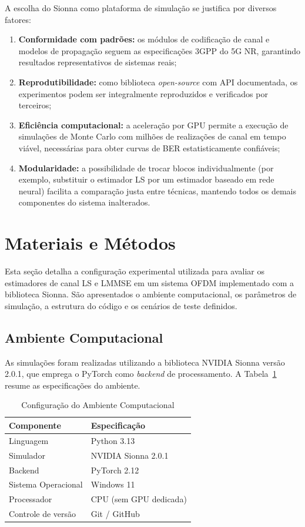 \documentclass[conference]{IEEEtran}
\begin{document}
A escolha do Sionna como plataforma de simulação se justifica por diversos fatores:
\begin{enumerate}
    \item \textbf{Conformidade com padrões:} os módulos de codificação de canal e modelos de propagação seguem as especificações 3GPP do 5G NR, garantindo resultados representativos de sistemas reais;
    \item \textbf{Reprodutibilidade:} como biblioteca \textit{open-source} com API documentada, os experimentos podem ser integralmente reproduzidos e verificados por terceiros;
    \item \textbf{Eficiência computacional:} a aceleração por GPU permite a execução de simulações de Monte Carlo com milhões de realizações de canal em tempo viável, necessárias para obter curvas de BER estatisticamente confiáveis;
    \item \textbf{Modularidade:} a possibilidade de trocar blocos individualmente (por exemplo, substituir o estimador LS por um estimador baseado em rede neural) facilita a comparação justa entre técnicas, mantendo todos os demais componentes do sistema inalterados.
\end{enumerate}

\section{Materiais e Métodos}

Esta seção detalha a configuração experimental utilizada para avaliar os estimadores de canal LS e LMMSE em um sistema OFDM implementado com a biblioteca Sionna. São apresentados o ambiente computacional, os parâmetros de simulação, a estrutura do código e os cenários de teste definidos.

\subsection{Ambiente Computacional}

As simulações foram realizadas utilizando a biblioteca NVIDIA Sionna versão 2.0.1, que emprega o PyTorch como \textit{backend} de processamento. A Tabela~\ref{tab:ambiente} resume as especificações do ambiente.

\begin{table}[htbp]
\centering
\caption{Configuração do Ambiente Computacional}
\label{tab:ambiente}
\begin{tabular}{@{}ll@{}}
\toprule
\textbf{Componente} & \textbf{Especificação} \\
\midrule
Linguagem & Python 3.13 \\
Simulador & NVIDIA Sionna 2.0.1 \\
Backend & PyTorch 2.12 \\
Sistema Operacional & Windows 11 \\
Processador & CPU (sem GPU dedicada) \\
Controle de versão & Git / GitHub \\
\bottomrule
\end{tabular}
\end{table}
\end{document}

